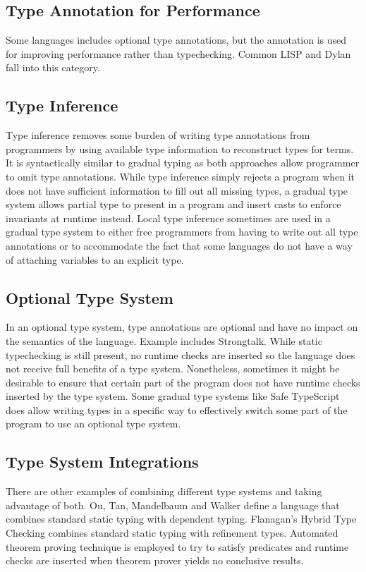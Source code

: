 \subsection{Type Annotation for Performance}
Some languages includes optional type annotations, but
the annotation is used for improving performance rather than
typechecking.
Common LISP\cite{steele1982overview}
and Dylan\cite{feinberg1996dylan} \cite{shalit1996dylan} fall into this category.

\subsection{Type Inference}
Type inference \cite{damas1982principal}\cite{hindley1969principle}\cite{milner1978theory}
removes some burden of writing type annotations from programmers
by using available type information to reconstruct types for terms.
It is syntactically similar to gradual typing as both approaches
allow programmer to omit type annotations.
While type inference simply rejects a program when it
does not have sufficient information to fill out all missing types,
a gradual type system allows partial type to present in a program and insert casts
to enforce invariants at runtime instead.
Local type inference \cite{pierce2000local} sometimes are used in a gradual type
system to either free programmers from having to write out all type annotations
or to accommodate the fact that some languages do not have a way of attaching
variables to an explicit type.

\subsection{Optional Type System}

In an optional type system\cite{bracha2004pluggable},
type annotations are optional and have no impact on the semantics of the language.
Example includes Strongtalk\cite{bracha1993strongtalk}.
While static typechecking is still present, no runtime checks are inserted
so the language does not receive full benefits of a type system.
Nonetheless, sometimes it might be desirable to ensure that certain part of the program
does not have runtime checks inserted by the type system.
Some gradual type systems like Safe TypeScript\cite{rastogi2015safe} does allow writing
types in a specific way to effectively switch some part of the program to use an optional type system.

\subsection{Type System Integrations}

There are other examples of combining different type systems and taking advantage of both.
Ou, Tan, Mandelbaum and Walker\cite{ou2004dynamic} define a language that combines
standard static typing with dependent typing.
Flanagan's Hybrid Type Checking\cite{flanagan2006hybrid} combines standard static typing
with refinement types. Automated theorem proving technique is employed to try to satisfy predicates
and runtime checks are inserted when theorem prover yields no conclusive results.


